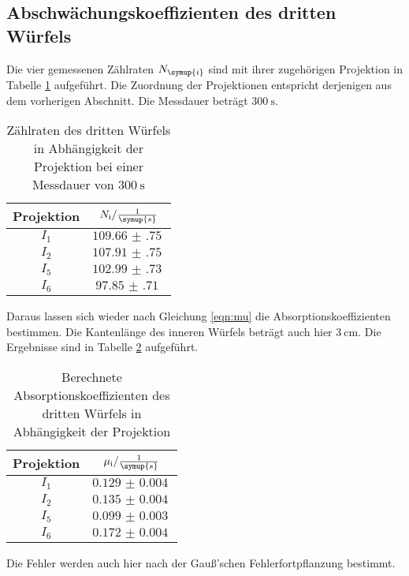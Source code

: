 \subsection{Abschwächungskoeffizienten des dritten Würfels}

Die vier gemessenen Zählraten $N_\symup{i}$ sind mit ihrer zugehörigen Projektion in Tabelle
\ref{tab:w3} aufgeführt. Die Zuordnung der Projektionen entspricht derjenigen aus dem
vorherigen Abschnitt. Die Messdauer beträgt $\SI{300}{\second}$.

\begin{table}[H]
  \centering
  \caption{Zählraten des dritten Würfels in Abhängigkeit der Projektion bei einer Messdauer von $\SI{300}{\second}$ }
  \label{tab:w3}
  \begin{tabular}{c c}
    \toprule
    Projektion & $N_{\mathrm{i}} / \frac{1}{\symup{s}}$   \\
    \midrule
        $I_1$    & $\SI{109.66(75)}{}$ \\
        $I_2$    & $\SI{107.91(75)}{}$ \\
        $I_5$    & $\SI{102.99(73)}{}$ \\
        $I_6$    & $\SI{97.85(71)}{}$ \\
    \bottomrule
  \end{tabular}
\end{table}

Daraus lassen sich wieder nach Gleichung \ref{eqn:mu} die Absorptionskoeffizienten bestimmen.
Die Kantenlänge des inneren Würfels beträgt auch hier $\SI{3}{\centi\meter}$.
Die Ergebnisse sind in Tabelle \ref{tab:mu3} aufgeführt.

\begin{table}[H]
  \centering
  \caption{Berechnete Absorptionskoeffizienten des dritten Würfels in Abhängigkeit der Projektion}
  \label{tab:mu3}
  \begin{tabular}{c c}
    \toprule
    Projektion & $\mu_{\mathrm{i}} / \frac{1}{\symup{s}}$   \\
    \midrule
        $I_1$    & $\SI{0.129(4)}{}$ \\
        $I_2$    & $\SI{0.135(4)}{}$ \\
        $I_5$    & $\SI{0.099(3)}{}$ \\
        $I_6$    & $\SI{0.172(4)}{}$ \\
    \bottomrule
  \end{tabular}
\end{table}

Die Fehler werden auch hier nach der Gauß'schen Fehlerfortpflanzung bestimmt.

